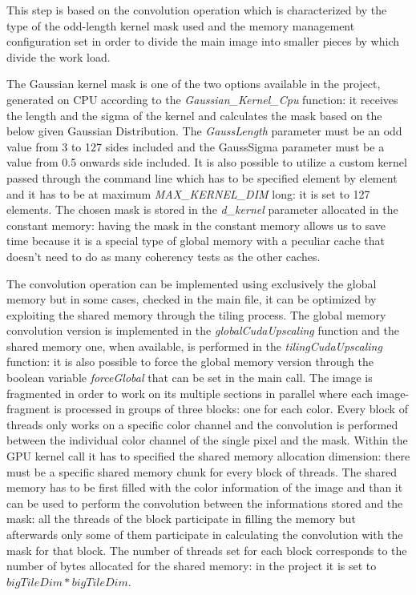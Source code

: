     This step is based on the convolution operation which is characterized by the type of the odd-length kernel mask used 
    and the memory management configuration set in order to divide the main image into smaller pieces by which divide the work load.   
    
    The Gaussian kernel mask is one of the two options available in the project, generated on CPU according to the \textit{Gaussian\_Kernel\_Cpu} function: 
    it receives the length and the sigma of the kernel and calculates the mask based on the below given Gaussian Distribution. 
    The \textit{GaussLength} parameter must be an odd value from 3 to 127 sides included and the GaussSigma parameter must be a value from 0.5 onwards side included.
    It is also possible to utilize a custom kernel passed through the command line which has to be specified element by element 
    and it has to be at maximum \textit{MAX\_KERNEL\_DIM}  long: it is set to 127 elements.
    The chosen mask is stored in the \textit{d\_kernel} parameter allocated in the constant memory: having the mask in the constant memory allows us to save time 
    because it is a special type of global memory with a peculiar cache that doesn’t need to do as many coherency tests as the other caches.

    The convolution operation can be implemented using exclusively the global memory but in some cases, checked in the main file, it can be optimized by exploiting the shared memory through the tiling process.
    The global memory convolution version is implemented in the \textit{globalCudaUpscaling} function and the shared memory one, when available, is performed in the \textit{tilingCudaUpscaling} function: 
    it is also possible to force the global memory version through the boolean variable \textit{forceGlobal} that can be set in the main call. 
    The image is fragmented in order to work on its multiple sections in parallel where each image-fragment is processed in groups of three blocks: one for each color.
    Every block of threads only works on a specific color channel and the convolution is performed between the individual color channel of the single pixel and the mask. 
    Within the GPU kernel call it has to specified the shared memory allocation dimension: there must be a specific shared memory chunk for every block of threads.  
    The shared memory has to be first filled with the color information of the image and than it can be used to perform the convolution between the informations stored and the mask: 
    all the threads of the block participate in filling the memory but afterwards only some of them participate in calculating the convolution with the mask for that block.
    The number of threads set for each block corresponds to the number of bytes allocated for the shared memory: in the project it is set to $bigTileDim*bigTileDim$. 




